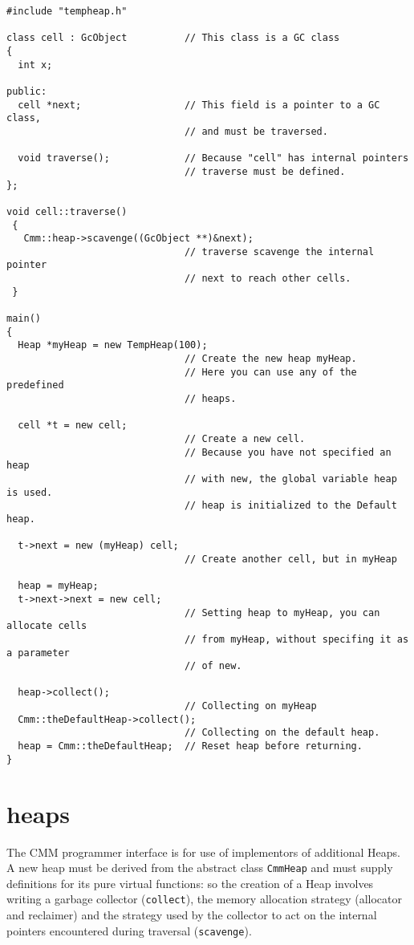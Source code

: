 \begin{verbatim}
#include "tempheap.h"

class cell : GcObject          // This class is a GC class
{
  int x;

public: 
  cell *next;                  // This field is a pointer to a GC class,
                               // and must be traversed.

  void traverse();             // Because "cell" has internal pointers
                               // traverse must be defined.
};

void cell::traverse()
 { 
   Cmm::heap->scavenge((GcObject **)&next); 
                               // traverse scavenge the internal pointer
                               // next to reach other cells.
 }

main()
{
  Heap *myHeap = new TempHeap(100);
                               // Create the new heap myHeap.
                               // Here you can use any of the predefined
                               // heaps.

  cell *t = new cell;
                               // Create a new cell. 
                               // Because you have not specified an heap
                               // with new, the global variable heap is used.
                               // heap is initialized to the Default heap.

  t->next = new (myHeap) cell;
                               // Create another cell, but in myHeap

  heap = myHeap;
  t->next->next = new cell;
                               // Setting heap to myHeap, you can allocate cells
                               // from myHeap, without specifing it as a parameter
                               // of new.

  heap->collect();
                               // Collecting on myHeap
  Cmm::theDefaultHeap->collect();
                               // Collecting on the default heap.
  heap = Cmm::theDefaultHeap;  // Reset heap before returning.
}
\end{verbatim}

\section {heaps}

The CMM programmer interface is for use of implementors of
additional Heaps. A new heap must be derived from the abstract
class {\tt CmmHeap} and must supply definitions for its pure virtual
functions: so the creation of a Heap involves writing a garbage
collector ({\tt collect}), the memory allocation strategy (allocator and
reclaimer) and the strategy used by the collector to act on the
internal pointers encountered during traversal ({\tt scavenge}).

